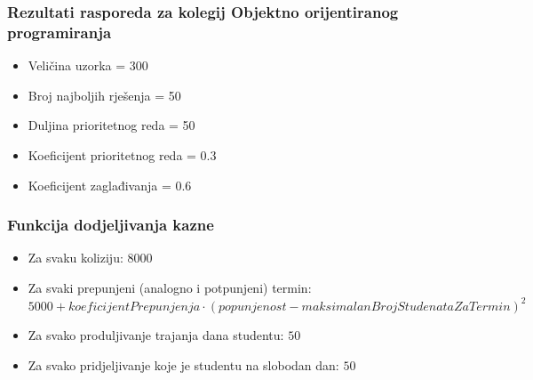 \documentclass{beamer}
\begin{document}
\begin{frame}
  \frametitle{Rezultati rasporeda za kolegij Objektno orijentiranog programiranja}
  \begin{itemize}
    \item Veličina uzorka = 300
    \item Broj najboljih rješenja = 50
    \item Duljina prioritetnog reda = 50
    \item Koeficijent prioritetnog reda = 0.3
    \item Koeficijent zaglađivanja = 0.6
  \end{itemize}
  \begin{table}
    \caption{Rezultati rasporeda za kolegij Objektno orijentiranog programiranja}
    \label{tbl:oop_300}
    \centering
  \end{table}
\end{frame}

\begin{frame}
  \frametitle{Funkcija dodjeljivanja kazne}
  \begin{itemize}
    \item Za svaku koliziju: $8000$
    \item Za svaki prepunjeni (analogno i potpunjeni) termin: $5000 + koeficijentPrepunjenja \cdot (popunjenost - maksimalanBrojStudenataZaTermin)^2$
    \item Za svako produljivanje trajanja dana studentu: $50$
    \item Za svako pridjeljivanje koje je studentu na slobodan dan: $50$
  \end{itemize}
  \end{frame}
\end{document}
